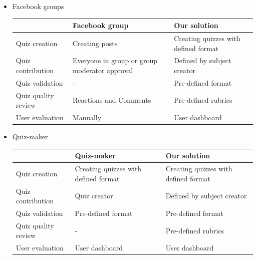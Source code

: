\documentclass[a4paper, 12pt]{report}
\begin{document}
    \begin{itemize}
        \item Facebook groups
        \begin{center}
            \begin{tabular}{| m{10em} | m{12em} | m{12em} |}
                \hline
                 & Facebook group & Our solution \\ 
                \hline\hline
                Quiz creation & Creating posts & \textcolor{ao(english)}{Creating quizzes with defined format} \\  
                \hline
                Quiz contribution & Everyone in group or group moderator approval & \textcolor{ao(english)}{Defined by subject creator} \\
                \hline
                Quiz validation & - & \textcolor{ao(english)}{Pre-defined format} \\
                \hline
                Quiz quality review & Reactions and Comments & \textcolor{ao(english)}{Pre-defined rubrics} \\
                \hline
                User evaluation & Manually & \textcolor{ao(english)}{User dashboard} \\
                \hline
            \end{tabular}
        \end{center}

        \item Quiz-maker
        \begin{center}
            \begin{tabular}{| m{10em} | m{12em} | m{12em} |}
                \hline
                 & Quiz-maker & Our solution \\ 
                \hline\hline
                Quiz creation & \textcolor{ao(english)}{Creating quizzes with defined format} & \textcolor{ao(english)}{Creating quizzes with defined format} \\  
                \hline
                Quiz contribution & Quiz creator & \textcolor{ao(english)}{Defined by subject creator} \\
                \hline
                Quiz validation & \textcolor{ao(english)}{Pre-defined format} & \textcolor{ao(english)}{Pre-defined format} \\
                \hline
                Quiz quality review & - & \textcolor{ao(english)}{Pre-defined rubrics} \\
                \hline
                User evaluation & \textcolor{ao(english)}{User dashboard} & \textcolor{ao(english)}{User dashboard} \\
                \hline
            \end{tabular}
        \end{center}


\end{itemize}
\end{document}
